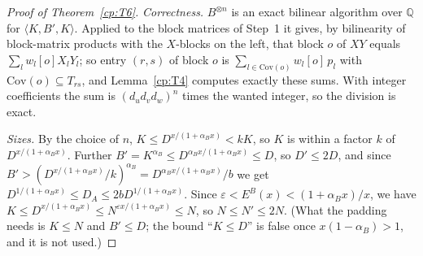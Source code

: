 \documentclass[11pt]{article}
\theoremstyle{definition}
\theoremstyle{remark}
\providecommand{\eps}{\varepsilon}
\providecommand{\Q}{\mathbb{Q}}
\newcommand{\mat}[3]{\langle #1,#2,#3\rangle} %
\newcommand{\Cov}{\mathrm{Cov}}               %
\newcommand{\alB}{\alpha_B}                   %
\newcommand{\Erange}[1]{E^{#1}}               %
\begin{document}
\begin{proof}[Proof of Theorem~\ref{cp:T6}]
\emph{Correctness.} $B^{\otimes n}$ is an exact bilinear algorithm over $\Q$ for $\mat K{B'}K$. Applied to the block matrices of Step~1 it gives, by bilinearity of block-matrix products with the $X$-blocks on the left, that block $o$ of $XY$ equals $\sum_lw_l[o]X_lY_l$; so entry $(r,s)$ of block $o$ is $\sum_{l\in\Cov(o)}w_l[o]\,p_l$ with $\Cov(o)\subseteq T_{rs}$, and Lemma~\ref{cp:T4} computes exactly these sums. With integer coefficients the sum is $(d_ud_vd_w)^n$ times the wanted integer, so the division is exact.

\emph{Sizes.} By the choice of $n$, $K\le D^{x/(1+\alB x)}<kK$, so $K$ is within a factor $k$ of $D^{x/(1+\alB x)}$. Further $B'=K^{\alB}\le D^{\alB x/(1+\alB x)}\le D$, so $D'\le2D$, and since $B'>(D^{x/(1+\alB x)}/k)^{\alB}=D^{\alB x/(1+\alB x)}/b$ we get $D^{1/(1+\alB x)}\le D_A\le2bD^{1/(1+\alB x)}$. Since $\eps<\Erange B(x)<(1+\alB x)/x$, we have $K\le D^{x/(1+\alB x)}\le N^{\eps x/(1+\alB x)}\le N$, so $N\le N'\le2N$. (What the padding needs is $K\le N$ and $B'\le D$; the bound ``$K\le D$'' is false once $x(1-\alB)>1$, and it is not used.)


\end{proof}
\end{document}
